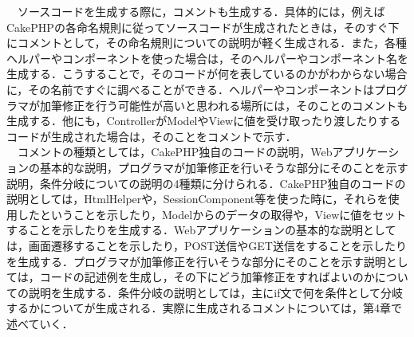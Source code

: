 \documentclass{funthesis}
\begin{document}
　ソースコードを生成する際に，コメントも生成する．具体的には，例えばCakePHPの各命名規則に従ってソースコードが生成されたときは，そのすぐ下にコメントとして，その命名規則についての説明が軽く生成される．また，各種ヘルパーやコンポーネントを使った場合は，そのヘルパーやコンポーネント名を生成する．こうすることで，そのコードが何を表しているのかがわからない場合に，その名前ですぐに調べることができる．ヘルパーやコンポーネントはプログラマが加筆修正を行う可能性が高いと思われる場所には，そのことのコメントも生成する．他にも，ControllerがModelやViewに値を受け取ったり渡したりするコードが生成された場合は，そのことをコメントで示す．\\
　コメントの種類としては，CakePHP独自のコードの説明，Webアプリケーションの基本的な説明，プログラマが加筆修正を行いそうな部分にそのことを示す説明，条件分岐についての説明の4種類に分けられる．CakePHP独自のコードの説明としては，HtmlHelperや，SessionComponent等を使った時に，それらを使用したということを示したり，Modelからのデータの取得や，Viewに値をセットすることを示したりを生成する．Webアプリケーションの基本的な説明としては，画面遷移することを示したり，POST送信やGET送信をすることを示したりを生成する．プログラマが加筆修正を行いそうな部分にそのことを示す説明としては，コードの記述例を生成し，その下にどう加筆修正をすればよいのかについての説明を生成する．条件分岐の説明としては，主にif文で何を条件として分岐するかについてが生成される．実際に生成されるコメントについては，第4章で述べていく．
\end{document}
